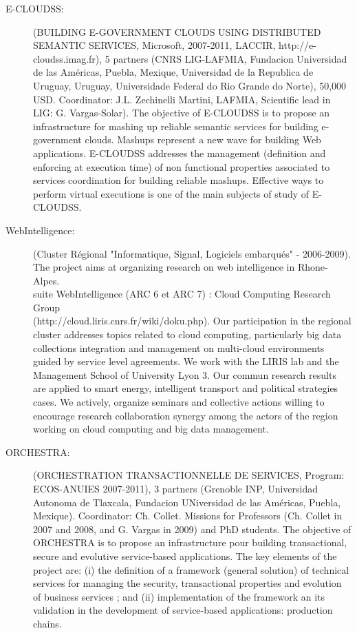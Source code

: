 \begin{description}

\item[E-CLOUDSS:] (BUILDING E-GOVERNMENT CLOUDS USING DISTRIBUTED SEMANTIC SERVICES, Microsoft, 2007-2011, LACCIR, http://e-cloudss.imag.fr), 5 partners (CNRS LIG-LAFMIA, Fundacion Universidad de las Am{\'e}ricas, Puebla, Mexique, Universidad de la Republica de Uruguay, Uruguay, Universidade Federal do Rio Grande do Norte), 50,000 USD. Coordinator: J.L. Zechinelli Martini, LAFMIA, Scientific lead in LIG: G. Vargas-Solar). 
The objective of E-CLOUDSS is to propose an infrastructure for mashing up reliable semantic services for building e-government clouds. Mashups represent a new wave for building Web applications. E-CLOUDSS addresses the management (definition and enforcing at execution time) of non functional properties associated to services coordination for building reliable mashups. Effective ways to perform virtual executions is one of the main subjects of study of E-CLOUDSS.

\item[WebIntelligence:] (Cluster R{\'e}gional "Informatique, Signal, Logiciels embarqu{\'e}s" - 2006-2009). The project aims at organizing research on web intelligence in Rhone-Alpes.  \\
suite WebIntelligence (ARC 6 et ARC 7) : Cloud Computing Research Group \\
(http://cloud.liris.cnrs.fr/wiki/doku.php). Our participation in the regional cluster addresses topics related to cloud computing, particularly big data collections integration and management on
multi-cloud environments guided by service level agreements. We work with the LIRIS lab and the Management School of University Lyon 3. Our commun research results are applied to smart energy, intelligent transport and political strategies cases. We actively, organize seminars and collective actions willing to encourage  research collaboration synergy among the actors of the region working on cloud computing and big data management.

\item[ORCHESTRA:] (ORCHESTRATION TRANSACTIONNELLE DE SERVICES, Program: ECOS-ANUIES 2007-2011), 3 partners (Grenoble INP, Universidad Autonoma de Tlaxcala, Fundacion UNiversidad de las Am{\'e}ricas, Puebla, Mexique). Coordinator: Ch. Collet. 
Missions for Professors (Ch. Collet in 2007 and  2008, and G. Vargas in 2009) and PhD students. The objective of ORCHESTRA is to propose an infrastructure pour building transactional, secure and evolutive service-based applications. The key elements of the project are: (i) the definition of a framework (general solution) of technical services for managing the security, transactional properties and evolution of business services ; and (ii) implementation of the framework an its validation in the development of service-based applications: production chains. 


\end{description}
